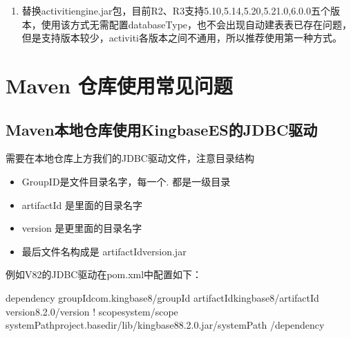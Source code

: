 \documentclass[a4,10pt,oneside,english]{sphinxmanual}
\begin{document}
\begin{sphinxVerbatim}[commandchars=\\\{\}]
\end{sphinxVerbatim}
\begin{enumerate}
%
\setcounter{enumi}{1}
\item {} 
替换activiti\sphinxhyphen{}engine.jar包，目前R2、R3支持5.10,5.14,5.20,5.21.0,6.0.0五个版本，使用该方式无需配置databaseType，也不会出现自动建表表已存在问题，但是支持版本较少，activiti各版本之间不通用，所以推荐使用第一种方式。

\end{enumerate}


\section{Maven 仓库使用常见问题}
\label{\detokenize{interface/maven:maven}}\label{\detokenize{interface/maven::doc}}

\subsection{Maven本地仓库使用KingbaseES的JDBC驱动}
\label{\detokenize{interface/maven:mavenkingbaseesjdbc}}
需要在本地仓库上方我们的JDBC驱动文件，注意目录结构
\begin{itemize}
\item {} 
GroupID是文件目录名字，每一个. 都是一级目录

\item {} 
artifactId 是里面的目录名字

\item {} 
version 是更里面的目录名字

\item {} 
最后文件名构成是  artifactId\sphinxhyphen{}version.jar

\end{itemize}

例如V82的JDBC驱动在pom.xml中配置如下：

\begin{sphinxVerbatim}[commandchars=\\\{\}]
\PYGZlt{}dependency\PYGZgt{}
      \PYGZlt{}groupId\PYGZgt{}com.kingbase8\PYGZlt{}/groupId\PYGZgt{}
      \PYGZlt{}artifactId\PYGZgt{}kingbase8\PYGZlt{}/artifactId\PYGZgt{}
      \PYGZlt{}version\PYGZgt{}8.2.0\PYGZlt{}/version\PYGZgt{}
      \PYGZlt{}!\PYGZhy{}\PYGZhy{} scope\PYGZgt{}system\PYGZlt{}/scope\PYGZgt{}
   \PYGZlt{}systemPath\PYGZgt{}\PYGZdl{}\PYGZob{}project.basedir\PYGZcb{}/lib/kingbase8\PYGZhy{}8.2.0.jar\PYGZlt{}/systemPath\PYGZhy{}\PYGZhy{}\PYGZgt{}
   \PYGZlt{}/dependency\PYGZgt{}
\end{sphinxVerbatim}
\end{document}
